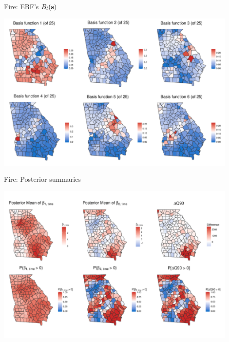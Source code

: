 \documentclass{beamer}
\begin{document}
\begin{frame}{Fire: EBF's $B_l(\mathbf{s})$}
	\begin{center}
		\includegraphics[width=0.9\textwidth]{fire-ebf-panel}
	\end{center}
\end{frame}


\begin{frame}{Fire: Posterior summaries}
	\begin{center}
		\includegraphics[width=0.9\textwidth]{fire-ebf-postpanel-slides}
	\end{center}
\end{frame}

%
\end{document}
